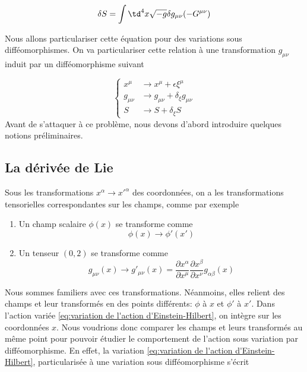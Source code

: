 \begin{equation}
    \delta S = \int \td ^4x \sqrt{-g}\delta g_{\mu \nu}( -G^{\mu \nu})
    \label{eq:variation de l'action d'Einstein-Hilbert}
\end{equation}

Nous allons particulariser cette équation pour des variations sous difféomorphismes. 
On va particulariser cette relation à une transformation $g_{\mu \nu}$ induit par un difféomorphisme suivant

\begin{equation}
\left\{
\begin{array}{rl}
x^{\mu} &\to x^{\mu} + \epsilon \xi^{\mu}\\
g_{\mu \nu} &\to g_{\mu \nu} + \delta_{\xi}g_{\mu \nu} \\
S &\to S + \delta_{\xi}S
\end{array}
\right.
\end{equation}
Avant de s'attaquer à ce problème, nous devons d'abord introduire quelques notions préliminaires.
\subsection{La dérivée de Lie}
Sous les transformations $x^{\alpha } \to x'^{\alpha }$ des coordonnées, on a les transformations tensorielles correspondantes sur les champs, comme par exemple
\begin{enumerate}
    \item Un champ scalaire $\phi(x)$ se transforme comme
    \begin{equation}
        \phi(x) \to \phi'(x')
    \end{equation}
    \item Un tenseur $(0,2)$ se transforme comme
    \begin{equation}
        g_{\mu \nu}(x) \rightarrow g'_{\mu \nu}(x)= \frac{\partial x^{\alpha}}{\partial x^{\mu}}\frac{\partial x^{\beta}}{\partial x^{\nu}}g_{ \alpha \beta}(x)
    \end{equation}
\end{enumerate}
Nous sommes familiers avec ces transformations. Néanmoins, elles relient des champs et leur transformés en des points différents: $\phi$ à $x$ et $\phi'$ à $x'$. Dans l'action variée \ref{eq:variation de l'action d'Einstein-Hilbert}, on intègre sur les coordonnées $x$. Nous voudrions donc comparer les champs et leurs transformés au même point pour pouvoir étudier le comportement de l'action sous variation par difféomorphisme. En effet, la variation \ref{eq:variation de l'action d'Einstein-Hilbert}, particularisée à une variation sous difféomorphisme s'écrit 

